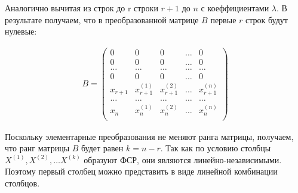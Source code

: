 \begin{answer}
  Аналогично вычитая из строк до r строки $r+1$ до $n$ с коеффициентами  $\lambda$.
  В результате получаем, что в преобразованной матрице $B$ первые  $r$ строк будут нулевые:
  
  \begin{gather*}
    B =
    \begin{pmatrix}
      0 & 0 & 0 & \ldots & 0 \\
      0 & 0 & 0 & \ldots & 0 \\
      \ldots & \ldots & \ldots & \ldots & \ldots \\
      0 & 0 & 0 & \ldots & 0 \\
      x_{r+1} & x_{r+1}^{(1)} & x_{r+1}^{(2)} & \ldots & x_{r+1}^{(n)} \\
      \ldots & \ldots & \ldots & \ldots & \ldots \\
      x_n & x_n^{(1)} & x_n^{(2)} & \ldots & x_n^{(n)} \\
    \end{pmatrix}
  \end{gather*} 

  Поскольку элементарные преобразования не меняют ранга матрицы, получаем, что ранг матрицы $B$ будет равен $k = n - r$.
  Так как по условию столбцы $X^{(1)}, X^{(2)}, \ldots X^{(k)}$ образуют ФСР, они являются линейно-независимыми. Поэтому первый столбец можно представить в виде линейной комбинации столбцов.

\end{answer}

